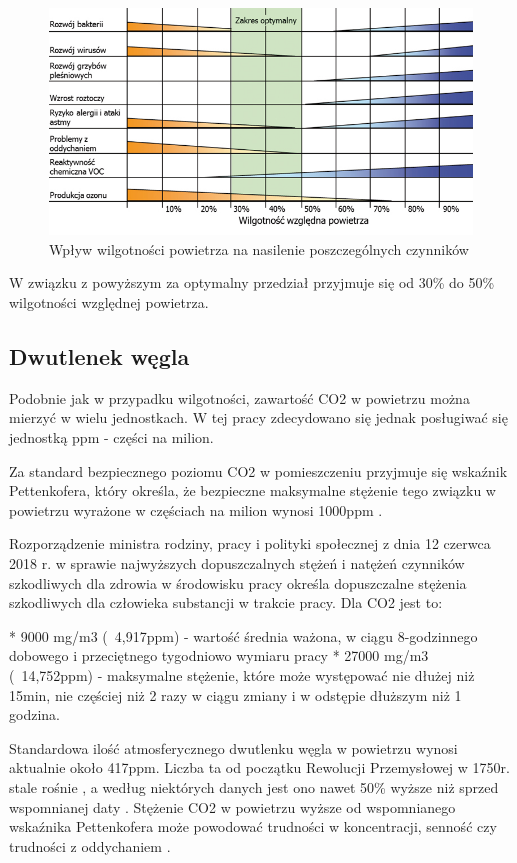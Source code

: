 \begin{figure}[H]
    \includegraphics[width=\textwidth]{zdj/wilgotnosc_powietrza_w_pomieszczeniach.jpg}
    \caption{Wpływ wilgotności powietrza na nasilenie poszczególnych czynników}
\end{figure}

W związku z powyższym za optymalny przedział przyjmuje się od 30\% do 50\% wilgotności względnej 
powietrza.

\subsection{Dwutlenek węgla}

Podobnie jak w przypadku wilgotności, zawartość CO2 w powietrzu można mierzyć w wielu jednostkach. 
W tej pracy zdecydowano się jednak posługiwać się jednostką ppm - części na milion.

Za standard bezpiecznego poziomu CO2 w pomieszczeniu przyjmuje się wskaźnik Pettenkofera, który określa, 
że bezpieczne maksymalne stężenie tego związku w powietrzu wyrażone w częściach na milion wynosi 1000ppm \cite{pettenhofer}.

Rozporządzenie ministra rodziny, pracy i polityki społecznej z dnia 12 czerwca 2018 r. w sprawie 
najwyższych dopuszczalnych stężeń i natężeń czynników szkodliwych dla zdrowia w środowisku \cite{min-stezenia} pracy określa 
dopuszczalne stężenia szkodliwych dla człowieka substancji w trakcie pracy. Dla CO2 jest to:

* 9000 mg/m3 (~4,917ppm) - wartość średnia ważona, w ciągu 8-godzinnego dobowego i przeciętnego tygodniowo wymiaru pracy
* 27000 mg/m3 (~14,752ppm) - maksymalne stężenie, które może występować nie dłużej niż 15min, nie częściej niż 2 razy w ciągu zmiany i w odstępie dłuższym niż 1 godzina.

Standardowa ilość atmosferycznego dwutlenku węgla w powietrzu wynosi aktualnie około 417ppm. 
Liczba ta od początku Rewolucji Przemysłowej w 1750r. stale rośnie \cite{atmo-co2-change}, a według niektórych danych jest 
ono nawet 50\% wyższe niż sprzed wspomnianej daty \cite{50-percent}. Stężenie CO2 w powietrzu wyższe od 
wspomnianego wskaźnika Pettenkofera może powodować trudności w koncentracji, senność czy 
trudności z oddychaniem \cite{pettenhofer}.

